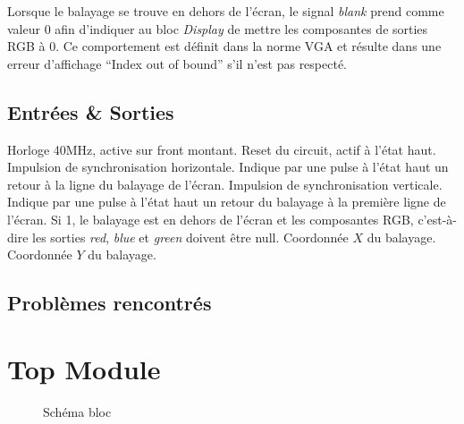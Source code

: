 \documentclass[french]{nakrule}
\begin{document}
Lorsque le balayage se trouve en dehors de l'écran, le signal \emph{blank} prend
comme valeur 0 afin d'indiquer au bloc \emph{Display} de mettre les composantes
de sorties RGB à 0. Ce comportement est définit dans la norme VGA et résulte
dans une erreur d'affichage ``Index out of bound'' s'il n'est pas respecté.

\subsection{Entrées \& Sorties}
\label{subsec:Entrées_Sorties_vga}

\begin{descr}
   Horloge 40MHz, active sur front montant.
   Reset du circuit, actif à l'état haut.
   Impulsion de synchronisation horizontale. Indique par une pulse
  à l'état haut un retour à la ligne du balayage de l'écran.
   Impulsion de synchronisation verticale. Indique par une pulse à
  l'état haut un retour du balayage à la première ligne de l'écran.
   Si 1, le balayage est en dehors de l'écran et les
  composantes RGB, c'est-à-dire les sorties \emph{red}, \emph{blue} et
  \emph{green} doivent être null.
   Coordonnée $X$ du balayage.
   Coordonnée $Y$ du balayage.
\end{descr}

\subsection{Problèmes rencontrés}
\label{subsec:Problèmes_rencontrés_alienRocket}

\clearpage

\section{Top Module}
\label{sec:topmodule}

\begin{figure}
\caption{Schéma bloc}
\label{topModuleBloc}
\end{figure}
\end{document}

